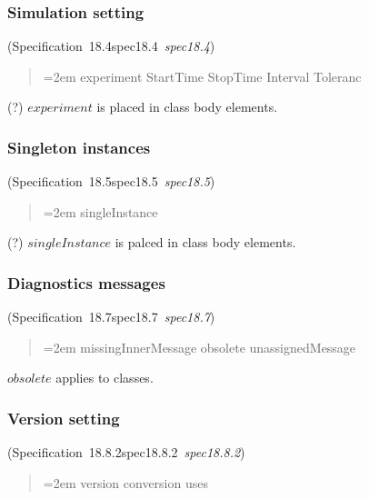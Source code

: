 \documentclass[10pt,b5paper]{article}
\def\specrefx#1#2{Specification~#1\ifx\relax#2\relax{}\else~{\it{}#2}\fi}
\def\specref#1{\specrefx{#1}{\csname spec#1\endcsname}}
\begin{document}
\subsubsection*{Simulation setting}
(\specref{18.4}\/)

\begin{quote}\spaceskip=2em
experiment
StartTime
StopTime
Interval
Toleranc
\end{quote}

(?) $\mathit{experiment}$ is placed in class body elements.

\subsubsection*{Singleton instances}
(\specref{18.5}\/)

\begin{quote}\spaceskip=2em
singleInstance
\end{quote}

(?) $\mathit{singleInstance}$ is palced in class body elements.

\subsubsection*{Diagnostics messages}
(\specref{18.7}\/)

\begin{quote}\spaceskip=2em
missingInnerMessage
obsolete
unassignedMessage
\end{quote}

$\mathit{obsolete}$ applies to classes.

\subsubsection*{Version setting}
(\specref{18.8.2}\/)

\begin{quote}\spaceskip=2em
version
conversion
uses
\end{quote}

\end{document}

